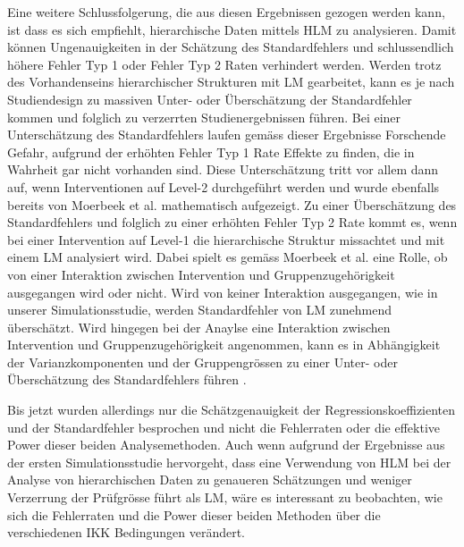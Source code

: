 \documentclass[12pt]{article}\usepackage[]{graphicx}\usepackage[]{color}
\begin{document}
Eine weitere Schlussfolgerung, die aus diesen Ergebnissen gezogen werden kann, ist dass es sich empfiehlt, hierarchische Daten mittels HLM zu analysieren. Damit können Ungenauigkeiten in der Schätzung des Standardfehlers und schlussendlich höhere Fehler Typ 1 oder Fehler Typ 2 Raten verhindert werden. Werden trotz des Vorhandenseins hierarchischer Strukturen mit LM gearbeitet, kann es je nach Studiendesign zu massiven Unter- oder Überschätzung der Standardfehler kommen und folglich zu verzerrten Studienergebnissen führen. Bei einer Unterschätzung des Standardfehlers laufen gemäss dieser Ergebnisse Forschende Gefahr, aufgrund der erhöhten Fehler Typ 1 Rate Effekte zu finden, die in Wahrheit gar nicht vorhanden sind. Diese Unterschätzung tritt vor allem dann auf, wenn Interventionen auf Level-2 durchgeführt werden und wurde ebenfalls bereits von Moerbeek et al. \citeyearpar{MOERBEEK2003341} mathematisch aufgezeigt. Zu einer Überschätzung des Standardfehlers und folglich zu einer erhöhten Fehler Typ 2 Rate kommt es, wenn bei einer Intervention auf Level-1 die hierarchische Struktur missachtet und mit einem LM analysiert wird. Dabei spielt es gemäss Moerbeek et al. \citeyearpar{MOERBEEK2003341} eine Rolle, ob von einer Interaktion zwischen Intervention und Gruppenzugehörigkeit ausgegangen wird oder nicht. Wird von keiner Interaktion ausgegangen, wie in unserer Simulationsstudie, werden Standardfehler von LM zunehmend überschätzt. Wird hingegen bei der Anaylse eine Interaktion zwischen Intervention und Gruppenzugehörigkeit angenommen, kann es in Abhängigkeit der Varianzkomponenten und der Gruppengrössen zu einer Unter- oder Überschätzung des Standardfehlers führen \citep{MOERBEEK2003341}. 

Bis jetzt wurden allerdings nur die Schätzgenauigkeit der Regressionskoeffizienten und der Standardfehler besprochen und nicht die Fehlerraten oder die effektive Power dieser beiden Analysemethoden. Auch wenn aufgrund der Ergebnisse aus der ersten Simulationsstudie hervorgeht, dass eine Verwendung von HLM bei der Analyse von hierarchischen Daten zu genaueren Schätzungen und weniger Verzerrung der Prüfgrösse führt als LM, wäre es interessant zu beobachten, wie sich die Fehlerraten und die Power dieser beiden Methoden über die verschiedenen IKK Bedingungen verändert. 
\end{document}
